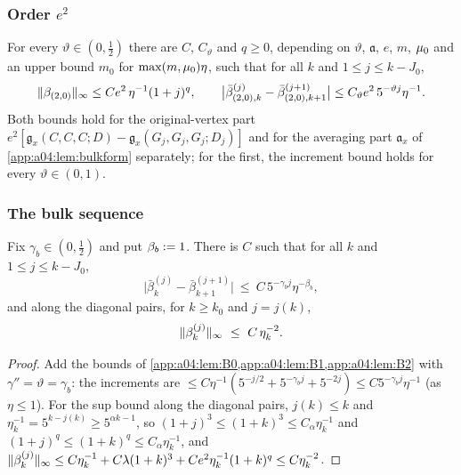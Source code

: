 \subsubsection{Order \texorpdfstring{$e^2$}{e\^2}}

\begin{lemma}\label{app:a04:lem:B2}
For every $\vartheta\in(0,\frac12)$ there are $C$, $C_\vartheta$ and $q\ge0$, depending on $\vartheta$, $\mathfrak a$, $e$, $m$, $\mu_0$ and an upper bound $m_0$ for $\max(m,\mu_0)\eta$, such that for all $k$ and $1\le j\le k-J_0$,
\[
\lVert \beta_{(2,0)}\rVert_\infty\le Ce^2\,\eta^{-1}(1+j)^{q},\qquad\big|\bar\beta^{(j)}_{(2,0),k}-\bar\beta^{(j+1)}_{(2,0),k+1}\big|\le C_\vartheta e^2\,5^{-\vartheta j}\eta^{-1}.
\]
Both bounds hold for the original-vertex part $e^2[\mathfrak g_x(C,C,C;D)-\mathfrak g_x(G_j,G_j,G_j;D_j)]$ and for the averaging part $\mathfrak a_x$ of \cref{app:a04:lem:bulkform} separately; for the first, the increment bound holds for every $\vartheta\in(0,1)$.
\end{lemma}







\subsubsection{The bulk sequence}

\begin{lemma}\label{app:a04:lem:BULK}
Fix $\gamma_b\in(0,\frac12)$ and put $\beta_b:=1$. There is $C$ such that for all $k$ and $1\le j\le k-J_0$,
\begin{equation}\label{app:a04:eq:BULKinc}
\big|\bar\beta^{(j)}_k-\bar\beta^{(j+1)}_{k+1}\big|\ \le\ C\,5^{-\gamma_bj}\eta^{-\beta_b},
\end{equation}
and along the diagonal pairs, for $k\ge k_0$ and $j=j(k)$,
\begin{equation}\label{app:a04:eq:BULKsup}
\lVert \beta^{(j)}_k\rVert_\infty\ \le\ C\,\eta_k^{-2}.
\end{equation}
\end{lemma}
\begin{proof}
Add the bounds of \cref{app:a04:lem:B0,app:a04:lem:B1,app:a04:lem:B2} with $\gamma''=\vartheta=\gamma_b$: the increments are $\le C\eta^{-1}(5^{-j/2}+5^{-\gamma_bj}+5^{-2j})\le C5^{-\gamma_bj}\eta^{-1}$ (as $\eta\le1$). For the sup bound along the diagonal pairs, $j(k)\le k$ and $\eta_k^{-1}=5^{k-j(k)}\ge5^{\alpha k-1}$, so $(1+j)^3\le(1+k)^3\le C_\alpha\eta_k^{-1}$ and $(1+j)^q\le(1+k)^q\le C_\alpha\eta_k^{-1}$, and $\lVert \beta^{(j)}_k\rVert_\infty\le C\eta_k^{-1}+C\lambda(1+k)^3+Ce^2\eta_k^{-1}(1+k)^q\le C\eta_k^{-2}$.
\end{proof}

